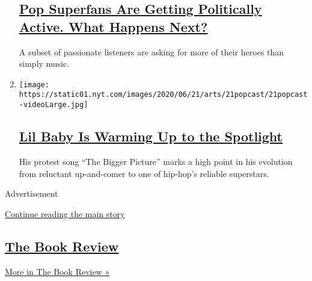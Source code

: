 \begin{enumerate}
  \hypertarget{pop-superfans-are-getting-politically-active-what-happens-next}{%
  \subsection{\texorpdfstring{\href{/2020/06/30/arts/music/popcast-superfans-politics.html}{Pop
  Superfans Are Getting Politically Active. What Happens
  Next?}}{Pop Superfans Are Getting Politically Active. What Happens Next?}}\label{pop-superfans-are-getting-politically-active-what-happens-next}}

  A subset of passionate listeners are asking for more of their heroes
  than simply music.
\item
  \texttt{[image: https://static01.nyt.com/images/2020/06/21/arts/21popcast/21popcast-videoLarge.jpg]}

  \hypertarget{lil-baby-is-warming-up-to-the-spotlight}{%
  \subsection{\texorpdfstring{\href{/2020/06/21/arts/music/popcast-lil-baby.html}{Lil
  Baby Is Warming Up to the
  Spotlight}}{Lil Baby Is Warming Up to the Spotlight}}\label{lil-baby-is-warming-up-to-the-spotlight}}

  His protest song ``The Bigger Picture'' marks a high point in his
  evolution from reluctant up-and-comer to one of hip-hop's reliable
  superstars.
\end{enumerate}

Advertisement

\protect\hyperlink{after-mid3}{Continue reading the main story}

\hypertarget{the-book-review}{%
\subsection{\texorpdfstring{\href{/column/book-review-podcast}{The Book
Review}}{The Book Review}}\label{the-book-review}}

\href{/column/book-review-podcast}{More in The Book Review »}


